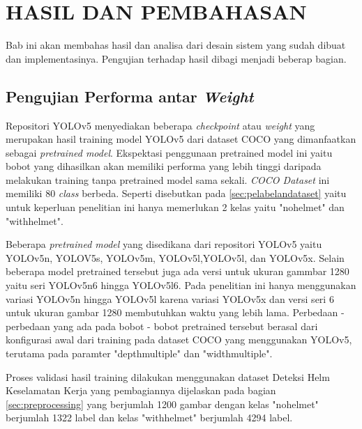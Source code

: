 \chapter{HASIL DAN PEMBAHASAN}
\label{chap:hasilpembahasan}


Bab ini akan membahas hasil dan analisa dari desain sistem yang sudah dibuat dan implementasinya. Pengujian terhadap hasil dibagi menjadi beberap bagian.

\section{Pengujian Performa antar \emph{Weight}}
\label{sec:ujiperforma}
\par Repositori YOLOv5 menyediakan beberapa \emph{checkpoint} atau \emph{weight} yang 
merupakan hasil training model YOLOv5 dari dataset COCO yang dimanfaatkan sebagai 
\emph{pretrained model}. Ekspektasi penggunaan pretrained model ini yaitu bobot yang 
dihasilkan akan memiliki performa yang lebih tinggi daripada melakukan training tanpa 
pretrained model sama sekali. \emph{COCO Dataset} ini memiliki 80 \emph{class} berbeda. 
Seperti disebutkan pada \ref{sec:pelabelandataset} yaitu untuk keperluan penelitian ini 
hanya memerlukan 2 kelas yaitu "no\textunderscore helmet" dan "with\textunderscore helmet". 

\par Beberapa \emph{pretrained model} yang disedikana dari repositori YOLOv5 yaitu YOLOv5n, YOLOV5s, 
YOLOv5m, YOLOv5l,YOLOv5l, dan YOLOv5x. Selain beberapa model pretrained tersebut juga ada versi 
untuk ukuran gammbar 1280 yaitu seri YOLOv5n6 hingga YOLOv5l6. Pada penelitian ini hanya 
menggunakan variasi YOLOv5n hingga YOLOv5l karena variasi YOLOv5x dan versi seri 6 untuk 
ukuran gambar 1280 membutuhkan waktu yang lebih lama. Perbedaan - perbedaan yang ada pada 
bobot - bobot pretrained tersebut berasal dari konfigurasi awal dari training pada dataset 
COCO yang menggunakan YOLOv5, terutama pada paramter "depth\textunderscore multiple" 
dan "width\textunderscore multiple".

\par Proses validasi hasil training dilakukan menggunakan dataset Deteksi Helm Keselamatan 
Kerja yang pembagiannya dijelaskan pada bagian \ref{sec:preprocessing} yang berjumlah 1200 
gambar dengan kelas "no\textunderscore helmet" berjumlah 1322 label dan kelas 
"with\textunderscore helmet" berjumlah 4294 label.

